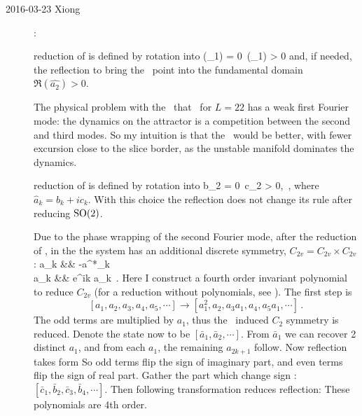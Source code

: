 \begin{description}
\item[2016-03-23 Xiong] :

{\bf \FFslice} reduction of 
is defined by rotation into
\beq
\Re(_1) = 0 \,\quad \Im(_1) > 0
and, if needed, the reflection to bring the \statesp\ point into the
fundamental domain $\Re(\hat{a_2}) > 0$.

The physical problem with the  \fFslice\ that \KS\ for $L=22$ has a weak
first Fourier mode: the dynamics on the attractor is a competition between
the second and third modes. So my intuition is that the \sFslice\ would be
better, with fewer excursion close to the {slice border}, as the 
unstable manifold dominates the dynamics.

 {\bf \SFslice} reduction of  is defined by rotation into
\beq
b_2 = 0 \,\quad c_2 > 0,
\,,
where $\hat{a}_k = b_k+ic_k$. With this choice the reflection
 does not change its rule  after reducing $\SOn{2}$.

Due to the phase wrapping of the second Fourier mode,  after the
 reduction of , in the {\reducedsp} the system
has an additional discrete symmetry,
$C_{2v} = C_{2v}\times C_{2v}$:
\bea
  a_k  &\to& -a^*_k     \label{XDsFsliceRefl}\\
  a_k  &\to& e^{ik\pi} a_k  \label{XDsFsliceShift2}
\,.
\eea
Here I construct a fourth order invariant polynomial to reduce $C_{2v}$
(for a reduction without polynomials, see ).
The first step is
\[
  [a_1, a_2, a_3, a_4, a_5, \cdots] \to
  [a^2_1, a_2, a_3a_1, a_4, a_5a_1, \cdots]
\,.
\]
The odd terms are multiplied by $a_1$, thus the \sFslice\ induced $C_2$
symmetry  is reduced.
Denote the state now to be $[\bar{a}_1, \bar{a}_2, \cdots]$.
From $\bar{a}_1$ we can recover 2 distinct $a_1$, and from each $a_1$, the
remaining $a_{2k+1}$ follow.  Now reflection  takes form
So odd terms flip the sign of imaginary part, and even terms flip the sign
of real part. Gather the part which change sign :
$[\bar{c}_1, \bar{b}_2, \bar{c}_3, \bar{b}_4, \cdots]$. Then following transformation
reduces reflection:
 
These polynomials are 4th order.


\end{description}
